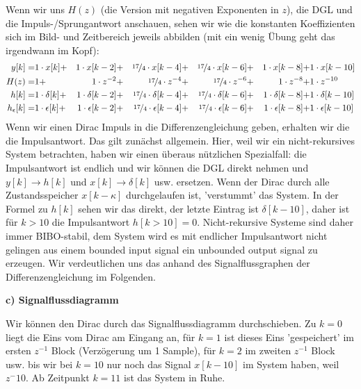 \begin{ExCalc}
\begin{center}
\end{center}
%
Wenn wir uns $H(z)$ (die Version mit negativen Exponenten in $z$), die DGL und
die Impuls-/Sprungantwort anschauen, sehen wir wie die konstanten Koeffizienten
sich im Bild- und Zeitbereich jeweils abbilden (mit ein wenig Übung geht das
irgendwann im Kopf):
\begin{align}
y[k] =& 1\cdot x[k] +& 1\cdot x[k-2] +&& \nicefrac{17}{4}\cdot x[k-4] +&& \nicefrac{17}{4}\cdot x[k-6] +&& 1\cdot x[k-8] +& 1\cdot x[k-10]\nonumber\\
H(z) =& 1 +& 1 \cdot z^{-2} +&& \nicefrac{17}{4} \cdot z^{-4}  +&& \nicefrac{17}{4} \cdot z^{-6} +&& 1 \cdot z^{-8} +& 1 \cdot z^{-10}\nonumber\\
h[k] =& 1 \cdot \delta[k] +& 1 \cdot \delta[k-2] +&& \nicefrac{17}{4} \cdot \delta[k-4] +&& \nicefrac{17}{4} \cdot \delta[k-6] +&& 1 \cdot \delta[k-8] +& 1 \cdot \delta[k-10]\nonumber\\
h_\epsilon[k] =& 1 \cdot \epsilon[k] +& 1 \cdot \epsilon[k-2] +&& \nicefrac{17}{4} \cdot \epsilon[k-4] +&& \nicefrac{17}{4} \cdot \epsilon[k-6] +&& 1 \cdot \epsilon[k-8] +& 1 \cdot \epsilon[k-10]
\end{align}
Wenn wir einen Dirac Impuls in die Differenzengleichung geben,
erhalten wir die die Impulsantwort. Das gilt zunächst allgemein.
Hier, weil wir ein nicht-rekursives
System betrachten, haben wir einen überaus nützlichen Spezialfall:
die Impulsantwort ist endlich und wir können die
DGL direkt nehmen und $y[k]\rightarrow h[k]$ und $x[k]\rightarrow \delta[k]$ usw.
ersetzen. Wenn der Dirac durch alle Zustandsspeicher
$x[k-\kappa]$ durchgelaufen ist, 'verstummt' das System.
%
In der Formel zu $h[k]$ sehen wir das direkt, der letzte Eintrag ist $\delta[k-10]$,
daher ist für $k>10$ die Impulsantwort $h[k>10]=0$.
%
Nicht-rekursive Systeme sind daher immer BIBO-stabil, dem System wird es mit
endlicher Impulsantwort nicht gelingen aus einem bounded input signal ein
unbounded output signal zu erzeugen.
%
Wir verdeutlichen uns das anhand
des Signalflussgraphen der Differenzengleichung im Folgenden.
%

\textbf{c) Signalflussdiagramm}

Wir können den Dirac durch das Signalflussdiagramm durchschieben.
Zu $k=0$ liegt die Eins vom Dirac am Eingang an, für $k=1$ ist dieses Eins
'gespeichert' im ersten $z^{-1}$ Block (Verzögerung um 1 Sample), für $k=2$ im zweiten $z^{-1}$ Block
usw. bis wir bei $k=10$ nur noch das Signal $x[k-10]$ im System haben, weil
$z^-10$. Ab Zeitpunkt $k=11$ ist das System in Ruhe.


\end{ExCalc}
